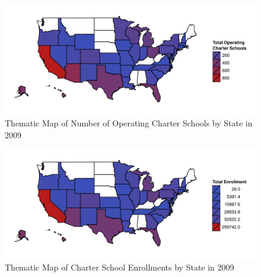 \documentclass[letterpaper,12pt]{article}
\begin{document}
\begin{figure}[h]
\includegraphics[width=\textwidth]{../Figures/CharterMapOperating.pdf}
\caption{Thematic Map of Number of Operating Charter Schools by State in 2009}
\label{fig:charterMap}
\end{figure}

\begin{figure}[h!]
\includegraphics[width=\textwidth]{../Figures/CharterMapEnrollment.pdf}
\caption{Thematic Map of Charter School Enrollments by State in 2009}
\label{fig:charterMap}
\end{figure}

\newpage
{}
\end{document}
